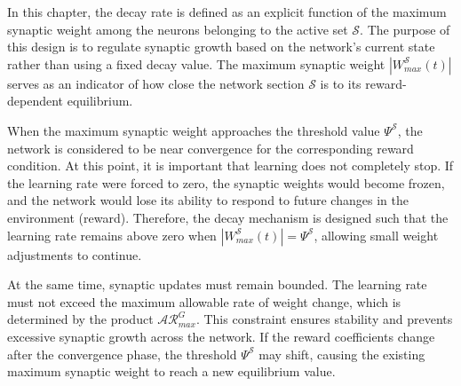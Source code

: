 
In this chapter, the decay rate is defined as an explicit function of the maximum synaptic weight among the neurons belonging to the active set $\mathcal{S}$. The purpose of this design is to regulate synaptic growth based on the network's current state rather than using a fixed decay value. The maximum synaptic weight $|W_{max}^{\mathcal{S}}(t)|$ serves as an indicator of how close the network section $\mathcal{S}$ is to its reward-dependent equilibrium.

When the maximum synaptic weight approaches the threshold value $\Psi^{\mathcal{S}}$, the network is considered to be near convergence for the corresponding reward condition. At this point, it is important that learning does not completely stop. If the learning rate were forced to zero, the synaptic weights would become frozen, and the network would lose its ability to respond to future changes in the environment (reward). Therefore, the decay mechanism is designed such that the learning rate remains above zero when $|W_{max}^{\mathcal{S}}(t)| = \Psi^{\mathcal{S}}$, allowing small weight adjustments to continue.

At the same time, synaptic updates must remain bounded. The learning rate must not exceed the maximum allowable rate of weight change, which is determined by the product $\mathcal{A}\mathcal{R}_{max}^{G}$. This constraint ensures stability and prevents excessive synaptic growth across the network. If the reward coefficients change after the convergence phase, the threshold $\Psi^{\mathcal{S}}$ may shift, causing the existing maximum synaptic weight to reach a new equilibrium value.


